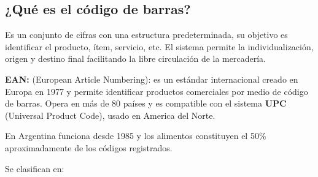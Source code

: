 \documentclass[twoside]{article}
\begin{document}
\subsection{¿Qué es el código de barras?}\par
Es un conjunto de cifras con una estructura predeterminada, su objetivo es identificar el producto, ítem, servicio, etc. El sistema permite la individualización, origen y destino final facilitando la libre circulación de la mercadería.\cite{bibliotecaCodigoBarras} \par

\textbf{EAN:} (European Article Numbering): es un estándar internacional creado en Europa en 1977 y permite identificar productos comerciales por medio de código de barras. Opera en más de 80 países y es compatible con el sistema \textbf{UPC} (Universal Product Code), usado en America del Norte.\par
En Argentina funciona desde 1985 y los alimentos constituyen el 50\% aproximadamente de los códigos registrados.\par
Se clasifican en:
\end{document}
